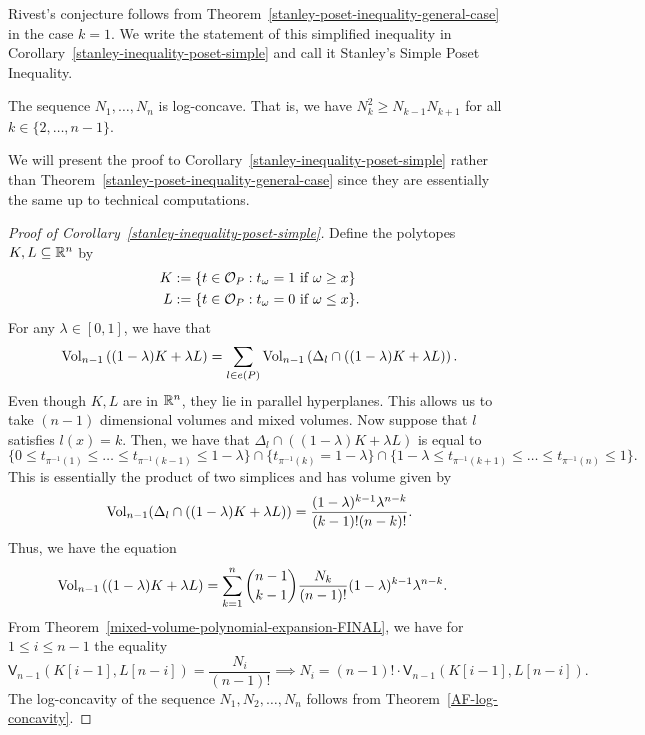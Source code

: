 \documentclass{puthesis-UG}
\begin{document}
Rivest's conjecture follows from Theorem~\ref{stanley-poset-inequality-general-case} in the case $k = 1$. We write the statement of this simplified inequality in Corollary~\ref{stanley-inequality-poset-simple} and call it Stanley's Simple Poset Inequality.

\begin{cor} \label{stanley-inequality-poset-simple}
	The sequence $N_1, \ldots, N_n$ is log-concave. That is, we have $N_k^2 \geq N_{k-1}N_{k+1}$ for all $k \in \{2, \ldots, n-1\}.$
\end{cor}

We will present the proof to Corollary~\ref{stanley-inequality-poset-simple} rather than Theorem~\ref{stanley-poset-inequality-general-case} since they are essentially the same up to technical computations.

\begin{proof}[Proof of Corollary~\ref{stanley-inequality-poset-simple}]
	Define the polytopes $K, L \subseteq \mathbb{R}^{n}$ by 
	\begin{align*}
		K & := \{t \in \mathcal{O}_P : t_\omega = 1 \text{ if } \omega \geq x\} \\
		L & := \{t \in \mathcal{O}_P : t_\omega = 0 \text{ if } \omega \leq x\}.
	\end{align*}
	For any $\lambda \in [0, 1]$, we have that 
	\[
		\operatorname{Vol}_{n-1} \left ( (1 - \lambda) K + \lambda L \right ) = \sum_{l \in e(P)}  \operatorname{Vol}_{n-1} \left ( \Delta_l \cap \left((1-\lambda) K + \lambda L\right) \right ).
	\]
	Even though $K, L$ are in $\mathbb{R}^n$, they lie in parallel hyperplanes. This allows us to take $(n-1)$ dimensional volumes and mixed volumes. Now suppose that $l$ satisfies $l(x) = k$. Then, we have that $\Delta_l \cap \left((1-\lambda) K + \lambda L \right)$ is equal to 
	\[ 
		\{0 \leq t_{\pi^{-1}(1)} \leq \ldots \leq t_{\pi^{-1}(k-1)} \leq 1-\lambda\} \cap \{t_{\pi^{-1}(k)} = 1-\lambda\} \cap \{1 - \lambda \leq t_{\pi^{-1}(k+1)} \leq \ldots \leq t_{\pi^{-1}(n)} \leq 1\}.
	\]
	This is essentially the product of two simplices and has volume given by
	\[
		\operatorname{Vol}_{n-1} (\Delta_l \cap \left((1 - \lambda) K + \lambda L\right)) = \frac{(1-\lambda)^{k-1} \lambda^{n-k}}{(k-1)! (n-k)!}.
	\]
	Thus, we have the equation 
	\begin{align*}
		\operatorname{Vol}_{n-1}\left((1-\lambda) K + \lambda L\right) & = \sum_{k = 1}^n \binom{n-1}{k-1} \frac{N_k}{(n-1)!} (1-\lambda)^{k-1} \lambda^{n-k}.
	\end{align*}
	From Theorem~\ref{mixed-volume-polynomial-expansion-FINAL}, we have for $1 \leq i \leq n-1$ the equality
	\[
		\mathsf{V}_{n-1} (K[i-1], L[n-i]) = \frac{N_i}{(n-1)!} \implies N_i = (n-1)! \cdot \mathsf{V}_{n-1} (K[i-1], L[n-i]).
	\]
	The log-concavity of the sequence $N_1, N_2, \ldots, N_n$ follows from Theorem~\ref{AF-log-concavity}. 
\end{proof}
\end{document}
